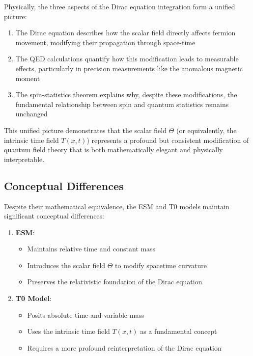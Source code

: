 \documentclass[12pt,a4paper]{article}
\newcommand{\Tfieldt}{T(x,t)}
\begin{document}
	Physically, the three aspects of the Dirac equation integration form a unified picture:
	
	\begin{enumerate}
		\item The Dirac equation describes how the scalar field directly affects fermion movement, modifying their propagation through space-time
		\item The QED calculations quantify how this modification leads to measurable effects, particularly in precision measurements like the anomalous magnetic moment
		\item The spin-statistics theorem explains why, despite these modifications, the fundamental relationship between spin and quantum statistics remains unchanged
	\end{enumerate}
	
	This unified picture demonstrates that the scalar field $\Theta$ (or equivalently, the intrinsic time field $\Tfieldt$) represents a profound but consistent modification of quantum field theory that is both mathematically elegant and physically interpretable.
	
	\subsection{Conceptual Differences}
	\label{subsec:conceptual_differences}
	
	Despite their mathematical equivalence, the ESM and T0 models maintain significant conceptual differences:
	
	\begin{enumerate}
		\item \textbf{ESM}:
		\begin{itemize}
			\item Maintains relative time and constant mass
			\item Introduces the scalar field $\Theta$ to modify spacetime curvature
			\item Preserves the relativistic foundation of the Dirac equation
		\end{itemize}
		
		\item \textbf{T0 Model}:
		\begin{itemize}
			\item Posits absolute time and variable mass
			\item Uses the intrinsic time field $\Tfieldt$ as a fundamental concept
			\item Requires a more profound reinterpretation of the Dirac equation
		\end{itemize}
	\end{enumerate}
	
\end{document}
